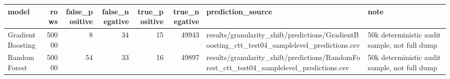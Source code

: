 \begin{tabular}{lrrrrrll}
\toprule
model & rows & false\_positive & false\_negative & true\_positive & true\_negative & prediction\_source & note \\
\midrule
GradientBoosting & 50000 & 8 & 34 & 15 & 49943 & results/granularity\_shift/predictions/GradientBoosting\_ctt\_test04\_samplelevel\_predictions.csv & 50k deterministic audit sample, not full dump \\
RandomForest & 50000 & 54 & 33 & 16 & 49897 & results/granularity\_shift/predictions/RandomForest\_ctt\_test04\_samplelevel\_predictions.csv & 50k deterministic audit sample, not full dump \\
\bottomrule
\end{tabular}

